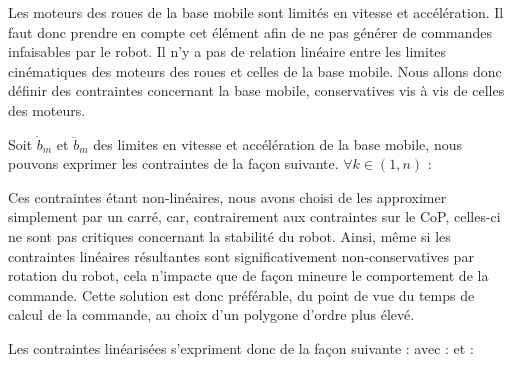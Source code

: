				
				\label{section.ctr_base_3_roues}
				
				Les moteurs des roues de la base mobile sont limités en vitesse et accélération. Il faut donc prendre en compte cet élément afin de ne pas générer de commandes infaisables par le robot.
				Il n'y a pas de relation linéaire entre les limites cinématiques des moteurs des roues et celles de la base mobile.
				Nous allons donc définir des contraintes concernant la base mobile, conservatives vis à vis de celles des moteurs.
				
				Soit $\dot{b}_{m}$ et $\ddot{b}_{m}$ des limites en vitesse et accélération de la base mobile, nous pouvons exprimer les contraintes de la façon suivante.  
				$\forall k \in (1, n)$ :
				
				Ces contraintes étant non-linéaires, nous avons choisi de les approximer simplement par un carré, car, contrairement aux contraintes sur le CoP, celles-ci ne sont pas critiques concernant la stabilité du robot.
				Ainsi, même si les contraintes linéaires résultantes sont significativement non-conservatives par rotation du robot, cela n'impacte que de façon mineure le comportement de la commande.
				Cette solution est donc préférable, du point de vue du temps de calcul de la commande, au choix d'un polygone d'ordre plus élevé.
				
				Les contraintes linéarisées s'expriment donc de la façon suivante :
					avec :
					et :
	
